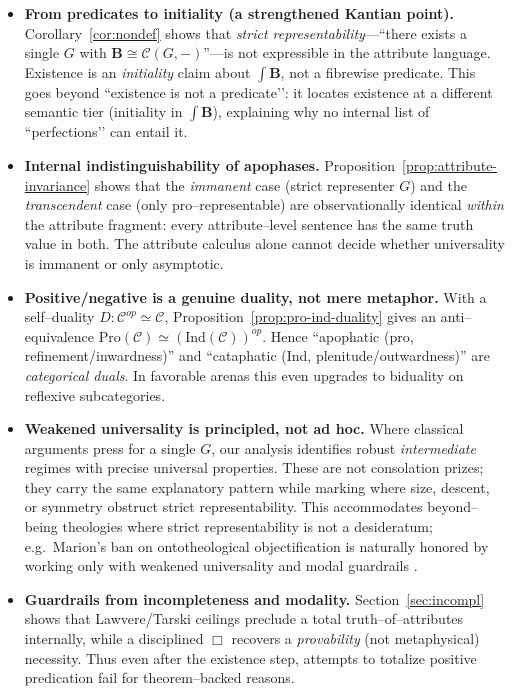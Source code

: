 \documentclass[11pt]{article}
\theoremstyle{upright}
\begin{document}
\begin{itemize}[leftmargin=2em]
\item \textbf{From predicates to initiality (a strengthened Kantian point).}
Corollary~\ref{cor:nondef} shows that \emph{strict representability}—“there exists a single \(G\) with \(\mathbf B\cong\mathcal C(G,-)\)”—is not expressible in the attribute language. Existence is an \emph{initiality} claim about $\int\!\mathbf B$, not a fibrewise predicate. This goes beyond “existence is not a predicate’’: it locates existence at a different semantic tier (initiality in $\int\!\mathbf B$), explaining why no internal list of “perfections’’ can entail it.

\item \textbf{Internal indistinguishability of apophases.}
Proposition~\ref{prop:attribute-invariance} shows that the \emph{immanent} case (strict representer \(G\)) and the \emph{transcendent} case (only pro–representable) are observationally identical \emph{within} the attribute fragment: every attribute–level sentence has the same truth value in both. The attribute calculus alone cannot decide whether universality is immanent or only asymptotic.

\item \textbf{Positive/negative is a genuine duality, not mere metaphor.}
With a self–duality $D:\mathcal C^{op}\!\simeq\!\mathcal C$, Proposition~\ref{prop:pro-ind-duality} gives an anti–equivalence 
$\mathrm{Pro}(\mathcal C)\simeq (\mathrm{Ind}(\mathcal C))^{op}$. Hence “apophatic (pro, refinement/inwardness)” and “cataphatic (Ind, plenitude/outwardness)” are \emph{categorical duals}. In favorable arenas this even upgrades to biduality on reflexive subcategories.

\item \textbf{Weakened universality is principled, not ad hoc.}
Where classical arguments press for a single \(G\), our analysis identifies robust \emph{intermediate} regimes with precise universal properties. These are not consolation prizes; they carry the same explanatory pattern while marking where size, descent, or symmetry obstruct strict representability. This accommodates beyond–being theologies where strict representability is not a desideratum; e.g.\ Marion’s ban on ontotheological objectification is naturally honored by working only with weakened universality and modal guardrails \citep{Marion1991GodWithoutBeing}.

\item \textbf{Guardrails from incompleteness and modality.}
Section~\ref{sec:incompl} shows that Lawvere/Tarski ceilings preclude a total truth–of–attributes internally, while a disciplined $\Box$ recovers a \emph{provability} (not metaphysical) necessity. Thus even after the existence step, attempts to totalize positive predication fail for theorem–backed reasons.


\end{itemize}
\end{document}
